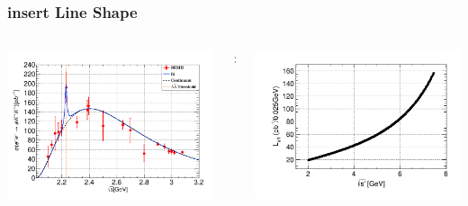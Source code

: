 \documentclass[aspectratio=169]{ctexbeamer}
\begin{document}
\begin{frame}
  \frametitle{insert Line Shape}
  \begin{columns}[t]
    \begin{column}{1.5\textheight}
      \begin{columns}
        \begin{column}{0.3\textwidth}
          \centering
          \includegraphics[width=\textwidth]{figures/phikk.png}
        \end{column}
        \begin{column}{0.05\textwidth}
          \centering
          $\times$
        \end{column}
        \begin{column}{0.3\textwidth}
          \centering
          \includegraphics[width=\textwidth]{figures/eff_lumino.png}

\end{column}
\end{columns}
\end{column}
\end{columns}
\end{frame}
\end{document}
